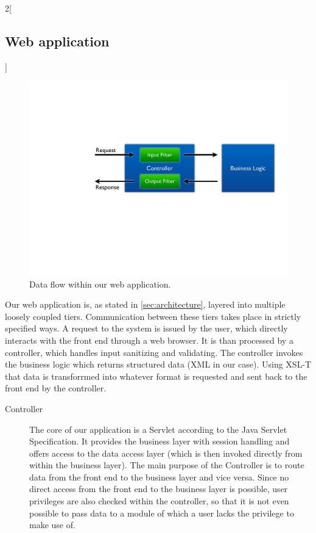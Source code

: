 \begin{multicols}{2}[\subsection{Web application}]

\begin{figure}[H]
	\centering
		\includegraphics[width=\columnwidth]{images/design_webapplication.pdf}
	\caption{Data flow within our web application.}
	\label{fig:design-web-application}
\end{figure}

Our web application is, as stated in \autoref{sec:architecture}, layered into multiple loosely coupled tiers. Communication between these tiers takes place in strictly specified ways. A request to the system is issued by the user, which directly interacts with the front end through a web browser. It is than processed by a controller, which handles input sanitizing and validating. The controller invokes the business logic which returns structured data (XML in our case). Using XSL-T that data is transforrmed into whatever format is requested and sent back to the front end by the controller.

\begin{description}
\item[Controller] The core of our application is a Servlet according to the Java Servlet Specification. It provides the business layer with session handling and offers access to the data access layer (which is then invoked directly from within the business layer). The main purpose of the Controller is to route data from the front end to the business layer and vice versa. Since no direct access from the front end to the business layer is possible, user privileges are also checked within the controller, so that it is not even possible to pass data to a module of which a user lacks the privilege to make use of.


\end{description}
\end{multicols}
